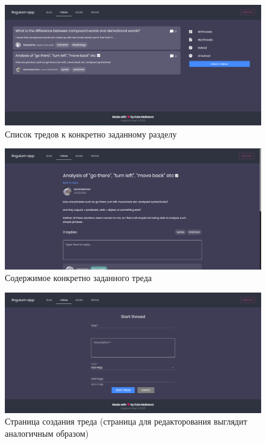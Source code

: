 \begin{figure}[h]
	\centering
	\includegraphics[width=\textwidth]{figures/topic}
	\caption{Список тредов к конкретно заданному разделу}
	\label{fig:topic}
\end{figure}

\begin{figure}[h]
	\centering
	\includegraphics[width=\textwidth]{figures/thread}
	\caption{Содержимое конкретно заданного треда}
	\label{fig:thread}
\end{figure}

\begin{figure}[h]
	\centering
	\includegraphics[width=\textwidth]{figures/createthread}
	\caption{Страница создания треда (страница для редакторования выглядит аналогичным образом)}
	\label{fig:createthread}
\end{figure}

